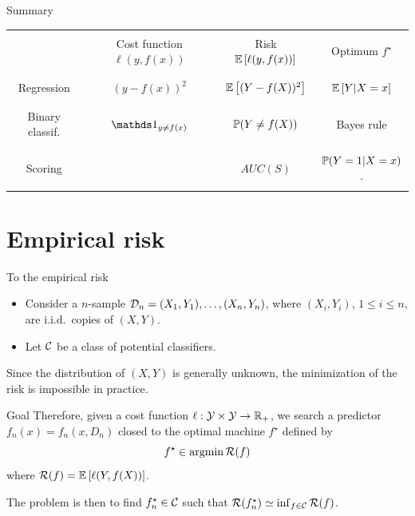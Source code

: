 \documentclass[xcolor={usenames,dvipsnames},handout]{beamer}
\begin{document}
\begin{frame}[shrink=20]{Summary}
\vfill
\begin{tabularx}{\textwidth}{c||c|c|c}
& & & \\
 & Cost function $\ell(y,f(x))$ & Risk $\E \left[ \ell(y,f(x)) \right]$ & Optimum $f^\star$ \\
 & & & \\
 \hline 
 \hline
 & & & \\
 Regression & $(y-f(x))^2$ & $ \E \left[ (Y-f(X))^2 \right] $ & $\E\left[ Y |X=x \right]$ \\
 & & & \\
 \hline
 & & & \\
 Binary classif. & $\one_{y\neq f(x)}$ & $\P(Y\neq f(X))$ & Bayes rule \\
 & & & \\
 \hline
 & & & \\
 Scoring &   & $AUC(S)$ & $\P(Y=1 |X=x)$. \\
 & & & \\
\end{tabularx}
\vfill
\end{frame}


\section{Empirical risk}


\begin{frame}{To the empirical risk}

\begin{itemize}
\item Consider a $n$-sample $\Dc_n = (X_1,Y_1),\hdots, (X_n,Y_n)$, where $(X_i,Y_i)$, $1\leq i \leq n$, are i.i.d.\ copies of $(X,Y)$.
\item Let \alert{$\Cc$ be a class of potential classifiers}. 
\end{itemize}
Since the distribution of $(X,Y)$ is generally unknown, the minimization of the risk is impossible in practice.
\begin{block}{Goal}
Therefore, given a cost function $\ell : \Yc \times \Yc \to \R_+$, we search a predictor $f_n (x) = f_n(x, D_n)$ closed to the optimal machine $f^\star$ defined by
$$f^\star \in \argmin \Rc(f)$$ 
where $\Rc(f) = \E \left[ \ell(Y , f (X ))\right]$.
\end{block}
The problem is then to find $f_n^\star\in \Cc$ such that $\Rc(f_n^\star) \simeq \inf_{f\in \Cc} \Rc(f)$.

\end{frame}
\end{document}
